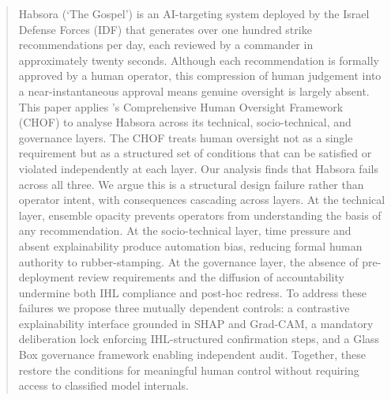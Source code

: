 \begin{abstract}
Habsora (`The Gospel') is an AI-targeting system deployed by the Israel Defense Forces (IDF) that generates over one hundred strike recommendations per day, each reviewed by a commander in approximately twenty seconds. Although each recommendation is formally approved by a human operator, this compression of human judgement into a near-instantaneous approval means genuine oversight is largely absent. This paper applies \citet{info12090385}'s Comprehensive Human Oversight Framework (CHOF) to analyse Habsora across its technical, socio-technical, and governance layers. The CHOF treats human oversight not as a single requirement but as a structured set of conditions that can be satisfied or violated independently at each layer. Our analysis finds that Habsora fails across all three. We argue this is a structural design failure rather than operator intent, with consequences cascading across layers. At the technical layer, ensemble opacity prevents operators from understanding the basis of any recommendation. At the socio-technical layer, time pressure and absent explainability produce automation bias, reducing formal human authority to rubber-stamping. At the governance layer, the absence of pre-deployment review requirements and the diffusion of accountability undermine both IHL compliance and post-hoc redress. To address these failures we propose three mutually dependent controls: a contrastive explainability interface grounded in SHAP and Grad-CAM, a mandatory deliberation lock enforcing IHL-structured confirmation steps, and a Glass Box governance framework \cite{ijcai2019p802} enabling independent audit. Together, these restore the conditions for meaningful human control without requiring access to classified model internals.
\end{abstract}